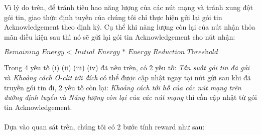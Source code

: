 \documentclass[12pt]{report}
\begin{document}
Vì lý do trên, để tránh tiêu hao năng lượng của các nút mạng và tránh xung đột gói tin, giao thức định tuyến của chúng tôi chỉ thực hiện gửi lại gói tin Acknowledgement theo định kỳ. Cụ thể khi năng lượng còn lại của nút nhận thỏa mãn điều kiện sau thì nó sẽ gửi lại gói tin Acknowledgement cho nút nhận:
\begin{center}
$ \textit{Remaining Energy < Initial Energy * Energy Reduction Threshold}$
\end{center}
Trong 4 yếu tố (i) (ii) (iii) (iv) đã nêu trên, có 2 yếu tố: \textit{Tần suất gói tin đã gửi} và \textit{Khoảng cách Ơ-clit tới đích} có thể được cập nhật ngay tại nút gửi sau khi đã truyền gói tin đi, 2 yếu tố còn lại: \textit{Khoảng cách tới hố của các nút mạng trên đường định tuyến} và \textit{Năng lượng còn lại của các nút mạng} thì cần cập nhật từ gói tin Acknowledgement.\\ \\ Dựa vào quan sát trên, chúng tôi có 2 bước tính reward như sau:
\end{document}
